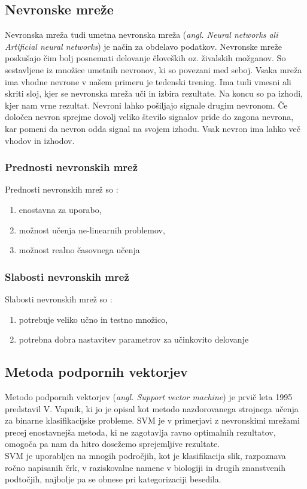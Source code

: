 \documentclass{acm_proc_article-sp}
\begin{document}
\subsection{Nevronske mreže}
Nevronska mreža tudi umetna nevronska mreža (\textit{angl.
Neural networks ali Artificial neural networks}) je način za obdelavo podatkov.
Nevronske mreže poskušajo čim bolj posnemati delovanje človeških oz. živalskih možganov.
So sestavljene iz množice umetnih nevronov, ki so povezani med seboj.
Vsaka mreža ima vhodne nevrone v našem primeru je tedenski trening.
Ima tudi vmesni ali skriti sloj, kjer se nevronska mreža uči in izbira rezultate.
Na koncu so pa izhodi, kjer nam vrne rezultat.
Nevroni lahko pošiljajo signale drugim nevronom.
Če določen nevron sprejme dovolj veliko število signalov pride do zagona nevrona, kar pomeni da nevron odda signal na svojem izhodu.
Vsak nevron ima lahko več vhodov in izhodov.

\subsubsection{Prednosti nevronskih mrež}
Prednosti nevronskih mrež so \cite{nnetworks}:
\begin{enumerate}
\item{enostavna za uporabo,}
\item{možnost učenja ne-linearnih problemov,}
\item{možnost realno časovnega učenja}
\end{enumerate}

\subsubsection{Slabosti nevronskih mrež}
Slabosti nevronskih mrež so \cite{nnetworks}:
\begin{enumerate}
\item{potrebuje veliko učno in testno množico,}
\item{potrebna dobra nastavitev parametrov za učinkovito delovanje}
\end{enumerate}

\subsection{Metoda podpornih vektorjev}
Metodo podpornih  vektorjev (\textit{angl. Support vector machine}) je prvič leta 1995 predstavil V. Vapnik\cite{Vapnik}, ki jo je opisal kot metodo nazdorovanega strojnega učenja za binarne klasifikacijske probleme. SVM je v primerjavi z nevronskimi mrežami precej enostavnejša metoda, ki ne zagotavlja ravno optimalnih rezultatov, omogoča pa nam da hitro dosežemo sprejemljive rezultate\cite{Hsu}.\\
SVM je uporabljen na mnogih področjih, kot je klasifikacija slik, razpoznava ročno napisanih črk, v raziskovalne namene v biologiji in drugih znanstvenih podtočjih, najbolje pa se obnese pri kategorizaciji besedila\cite{Wiki_svm}.\\
\end{document}
